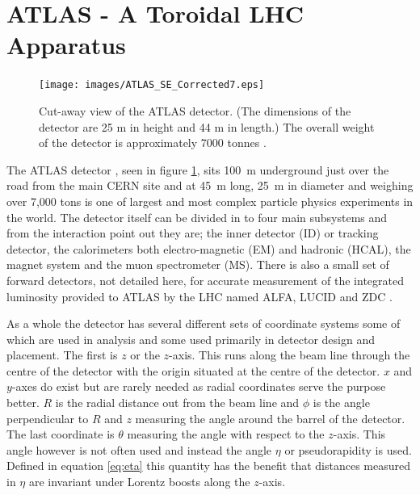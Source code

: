 
\section{ATLAS - A Toroidal LHC Apparatus}

	\begin{figure}[h]
		\begin{center}
			\texttt{[image: images/ATLAS\_SE\_Corrected7.eps]}
		\end{center}
		\caption{Cut-away view of the ATLAS detector. (The dimensions of the detector are 25 m in height and 44 m in length.) The overall weight of the detector is approximately 7000 tonnes \cite{Aad:1129811}.}
		\label{fig:ATLAS_cutaway}
	\end{figure}


	The ATLAS detector \cite{Aad:1129811}, seen in figure \ref{fig:ATLAS_cutaway}, sits \SI{100}{\m} underground just over the road from the main CERN site and at \SI{45}{\m} long, \SI{25}{\m} in diameter and weighing over 7,000 tons is one of largest and most complex particle physics experiments in the world. The detector itself can be divided in to four main subsystems and from the interaction point out they are; the inner detector (ID) or tracking detector, the calorimeters both electro-magnetic (EM) and hadronic (HCAL), the magnet system and the muon spectrometer (MS). There is also a small set of forward detectors, not detailed here, for accurate measurement of the integrated luminosity provided to ATLAS by the LHC named ALFA, LUCID and ZDC \cite{Aad:1129811}. 

	As a whole the detector has several different sets of coordinate systems some of which are used in analysis and some used primarily in detector design and placement. The first is $z$ or the $z$-axis. This runs along the beam line through the centre of the detector with the origin situated at the centre of the detector. $x$ and $y$-axes do exist but are rarely needed as radial coordinates serve the purpose better. $R$ is the radial distance out from the beam line and $\phi$ is the angle perpendicular to $R$ and $z$ measuring the angle around the barrel of the detector. The last coordinate is $\theta$ measuring the angle with respect to the $z$-axis. This angle however is not often used and instead the angle $\eta$ or pseudorapidity is used. Defined in equation \ref{eq:eta} this quantity has the benefit that distances measured in $\eta$ are invariant under Lorentz boosts along the $z$-axis.

